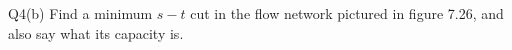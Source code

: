 \begin{problem}
  {Q4(b)}
  Find a minimum $s-t$ cut in the flow network pictured in figure 7.26, and also say what its capacity is.
\end{problem}
